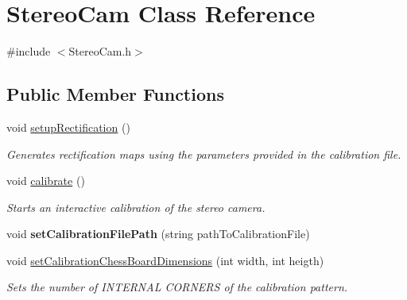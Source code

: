 \hypertarget{class_stereo_cam}{}\section{Stereo\+Cam Class Reference}
\label{class_stereo_cam}


{\ttfamily \#include $<$Stereo\+Cam.\+h$>$}

\subsection*{Public Member Functions}
\begin{DoxyCompactItemize}
\item 
void \hyperlink{class_stereo_cam_aafff8e42f4da4a952011908bf6e481d4}{setup\+Rectification} ()\hypertarget{class_stereo_cam_aafff8e42f4da4a952011908bf6e481d4}{}\label{class_stereo_cam_aafff8e42f4da4a952011908bf6e481d4}

\begin{DoxyCompactList}\small\item\em Generates rectification maps using the parameters provided in the calibration file. \end{DoxyCompactList}\item 
void \hyperlink{class_stereo_cam_a25f66a73769e1919cb1971a4ee4d2908}{calibrate} ()\hypertarget{class_stereo_cam_a25f66a73769e1919cb1971a4ee4d2908}{}\label{class_stereo_cam_a25f66a73769e1919cb1971a4ee4d2908}

\begin{DoxyCompactList}\small\item\em Starts an interactive calibration of the stereo camera. \end{DoxyCompactList}\item 
void {\bfseries set\+Calibration\+File\+Path} (string path\+To\+Calibration\+File)\hypertarget{class_stereo_cam_a03c513dcb12fb2beb44fb0faec30beef}{}\label{class_stereo_cam_a03c513dcb12fb2beb44fb0faec30beef}

\item 
void \hyperlink{class_stereo_cam_ad9bb4176706b1a36039872fb53940492}{set\+Calibration\+Chess\+Board\+Dimensions} (int width, int heigth)
\begin{DoxyCompactList}\small\item\em Sets the number of I\+N\+T\+E\+R\+N\+AL C\+O\+R\+N\+E\+RS of the calibration pattern. \end{DoxyCompactList}\end{DoxyCompactItemize}



